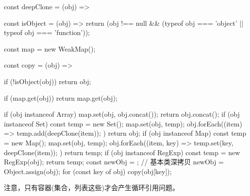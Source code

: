 \begin{JavaScript}
const deepClone = (obj) => {
  const isObject = (obj) => {
    return (obj !== null && (typeof obj === 'object' || typeof obj === 'function'));
  }
  
  const map = new WeakMap();

  const copy = (obj) => {
    if (!isObject(obj))
      return obj;
    
    if (map.get(obj))
      return map.get(obj);
    
    if (obj instanceof Array) {
      map.set(obj, obj.concat());
      return obj.concat();
    }
    if (obj instanceof Set) {
      const temp = new Set();
      map.set(obj, temp);
      obj.forEach((item) => {
        temp.add(deepClone(item));
      })
      return obj;
    }
    if (obj instanceof Map) {
      const temp = new Map();
      map.set(obj, temp);
      obj.forEach((item, key) => {
        temp.set(key, deepClone(item));
      })
      return temp;
    }
    if (obj instanceof RegExp) {
      const temp = new RegExp(obj);
      return temp;
    }
    const newObj = {};
    // 基本类深拷贝
    newObj = Object.assign(obj);
    for (const key of obj) {
      copy(obj[key]);
    }
  }
}
\end{JavaScript}

注意，只有容器(集合，列表这些)才会产生循环引用问题。